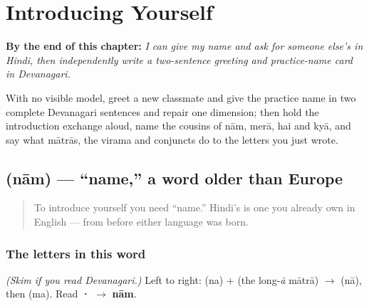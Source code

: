 
\chapter{Introducing Yourself}
\label{ch:introductions}

\begin{chapteropening}
\textbf{By the end of this chapter:} \emph{I can give my name and ask for someone else's in Hindi, then independently write a two-sentence greeting and practice-name card in Devanagari.}

With no visible model, greet a new classmate and give the practice name in two complete Devanagari sentences and repair one dimension; then hold the introduction exchange aloud, name the cousins of nām, merā, hai and kyā, and say what mātrās, the virama and conjuncts do to the letters you just wrote.
\end{chapteropening}

\section[\texorpdfstring{\hi{नाम} (nām)}{नाम (nām)}]{ (nām) — \textquotedblleft{}name,\textquotedblright{} a word older than Europe}

\label{lesson:HI-C02-naam}



\begin{quote}
To introduce yourself you need \textquotedblleft{}name.\textquotedblright{} Hindi's is one you already own in English — from before either language was born.
\end{quote}

\subsection*{The letters in this word}
\emph{(Skim if you read Devanagari.)} Left to right: \textbf{} (na) + \textbf{} (the long-\emph{ā} mātrā) $\to$ \textbf{} (nā), then \textbf{} (ma). Read \textbf{·} $\to$ \textbf{nām}.


